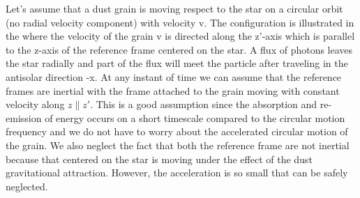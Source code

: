 \documentclass[12pt,a4paper]{article}
\begin{document}
Let's assume that a dust grain is moving respect to the star on a circular orbit (no radial velocity component) with velocity v. The configuration is illustrated in the where the velocity of the grain v is directed along the z'-axis which is parallel to the z-axis of the reference frame centered on the star. A flux of photons leaves the star radially and part of the flux will meet the particle after traveling in the antisolar direction -x. At any instant of time we can assume that the reference frames are inertial with the frame attached to the grain moving with constant velocity along $z\|z'$. This is a good assumption since the absorption and re-emission of energy occurs on a short timescale compared to the circular motion frequency and we do not have to worry about the accelerated circular motion of the grain. We also neglect the fact that both the reference frame are not inertial because that centered on the star is moving under the effect of the dust gravitational attraction. However, the acceleration is so small that can be safely neglected. 
\end{document}

